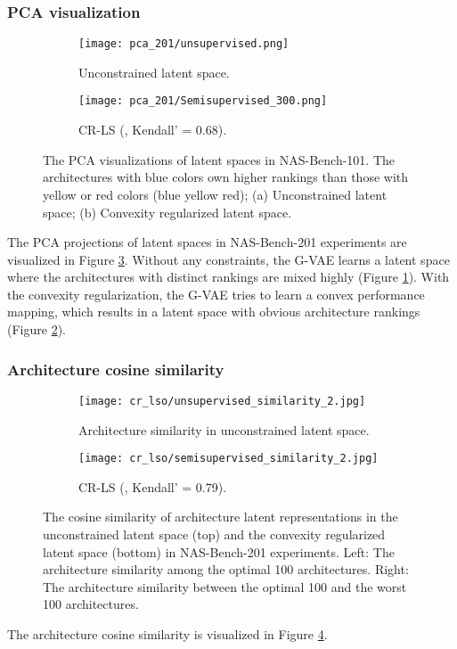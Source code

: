 \documentclass[10pt,twocolumn,letterpaper]{article}
\begin{document}
\subsubsection{PCA visualization}
\begin{figure}
	\centering
	\begin{subfigure}{1.0 \linewidth}
		\texttt{[image: pca\_201/unsupervised.png]}
		\caption{Unconstrained latent space.}
		\label{fig:pca_201_a}
	\end{subfigure}
	\begin{subfigure}{0.98 \linewidth}
		\texttt{[image: pca\_201/Semisupervised\_300.png]}
		\caption{CR-LS (, Kendall'  = 0.68).}
		\label{fig:pca_201_b}
	\end{subfigure}
	\caption{The PCA visualizations of latent spaces in NAS-Bench-101. The architectures with blue colors own higher rankings than those with yellow or red colors (blue  yellow  red); (a) Unconstrained latent space; (b) Convexity regularized latent space.}
	\label{fig:pca_201}
\end{figure} 
The PCA projections of latent spaces in NAS-Bench-201 experiments are visualized in Figure \ref{fig:pca_201}. Without any constraints, the G-VAE learns a latent space where the architectures with distinct rankings are mixed highly (Figure \ref{fig:pca_201_a}). With the convexity regularization, the G-VAE tries to learn a convex performance mapping, which results in a latent space with obvious architecture rankings (Figure \ref{fig:pca_201_b}).
\subsubsection{Architecture cosine similarity} 
\begin{figure}
	\centering
	\begin{subfigure}{1.05 \linewidth}
		\texttt{[image: cr\_lso/unsupervised\_similarity\_2.jpg]}
		\caption{Architecture similarity in unconstrained latent space.}
	\end{subfigure}
	\begin{subfigure}{1.05 \linewidth}
		\texttt{[image: cr\_lso/semisupervised\_similarity\_2.jpg]}
		\caption{CR-LS (, Kendall'  = 0.79).}
	\end{subfigure}
	\caption{The cosine similarity of architecture latent representations in the unconstrained latent space (top) and the convexity regularized latent space (bottom) in NAS-Bench-201 experiments. Left: The architecture similarity among the optimal 100 architectures. Right: The architecture similarity between the optimal 100 and the worst 100 architectures. }
	\label{fig:cos_201}
\end{figure} 
The architecture cosine similarity is visualized in Figure \ref{fig:cos_201}. 
\end{document}
